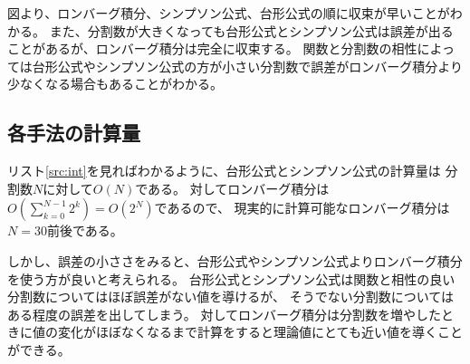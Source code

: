 \documentclass{jsarticle}
\begin{document}
        図より、ロンバーグ積分、シンプソン公式、台形公式の順に収束が早いことがわかる。
        また、分割数が大きくなっても台形公式とシンプソン公式は誤差が出ることがあるが、ロンバーグ積分は完全に収束する。
        関数と分割数の相性によっては台形公式やシンプソン公式の方が小さい分割数で誤差がロンバーグ積分より少なくなる場合もあることがわかる。

    \subsection{各手法の計算量}
        リスト\ref{src:int}を見ればわかるように、台形公式とシンプソン公式の計算量は
        分割数$N$に対して$O(N)$である。
        対してロンバーグ積分は$\displaystyle O\left(\sum_{k = 0}^{N - 1} 2^{k}\right) = O\left(2^N\right)$であるので、
        現実的に計算可能なロンバーグ積分は$N = 30$前後である。
        
        しかし、誤差の小ささをみると、台形公式やシンプソン公式よりロンバーグ積分を使う方が良いと考えられる。
        台形公式とシンプソン公式は関数と相性の良い分割数についてはほぼ誤差がない値を導けるが、
        そうでない分割数についてはある程度の誤差を出してしまう。
        対してロンバーグ積分は分割数を増やしたときに値の変化がほぼなくなるまで計算をすると理論値にとても近い値を導くことができる。
\end{document}
